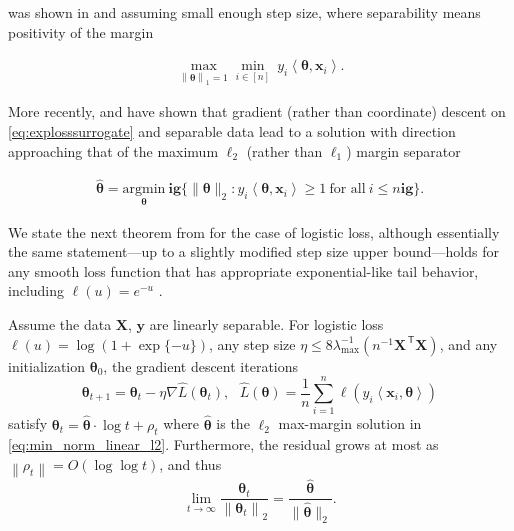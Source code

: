 was shown in \cite{zhang2005boosting} and \cite{telgarsky2013margins} assuming small enough step size, where separability means positivity of the margin

\begin{align}
	\label{eq:max_l1_margin}
	\max_{\left\|{\boldsymbol \theta}\right\|_1 = 1} \min_{i\in[n]}~ y_i\left\langle {\boldsymbol \theta},{\boldsymbol x}_i \right\rangle.
\end{align}

More recently, \cite{soudry2018implicit} and \cite{ji2018risk} have shown that gradient (rather than coordinate) descent on \eqref{eq:explosssurrogate} and separable data lead to a solution with direction approaching that of the maximum $\ell_2$ (rather than $\ell_1$) margin separator

\begin{align}
	\label{eq:min_norm_linear_l2}
	\widehat{{\boldsymbol \theta}} = \underset{{\boldsymbol \theta}}{\mathrm{argmin}} \  \mathbf{ig}\{ \| {\boldsymbol \theta} \|_2 : y_i\left\langle {\boldsymbol \theta},{\boldsymbol x}_i \right\rangle \geq 1 ~\text{for all}~ i \leq n \mathbf{ig}\}.
\end{align}

We state the next theorem from \cite{soudry2018implicit} for the case of logistic loss, although essentially the same statement---up to a slightly modified step size upper bound---holds for any smooth loss function that has appropriate exponential-like tail behavior, including $\ell(u)=e^{-u}$  \cite{soudry2018implicit,ji2018risk}.

\begin{theorem}
	Assume the data ${\boldsymbol X}$, ${\boldsymbol y}$ are linearly separable. For logistic loss $\ell(u)=\log(1+\exp\{-u\})$, any step size $\eta\leq 8
    \lambda^{-1}_{\text{max}}(n^{-1}\boldsymbol{{\boldsymbol X}}^\ensuremath{{\scriptscriptstyle\mathsf{\,T}}} \boldsymbol{{\boldsymbol X}})$, and any initialization ${\boldsymbol \theta}_0$, the gradient descent iterations
	$${\boldsymbol \theta}_{t+1} = {\boldsymbol \theta}_t - \eta \nabla \widehat{L}({\boldsymbol \theta}_t), ~~~\widehat{L}({\boldsymbol \theta}) = \frac{1}{n}\sum_{i=1}^n \ell (y_i \left\langle {\boldsymbol x}_i, {\boldsymbol \theta} \right\rangle)$$
	satisfy ${\boldsymbol \theta}_t = \widehat{{\boldsymbol \theta}} \cdot \log t + \rho_t$
	where $\widehat{{\boldsymbol \theta}}$ is the $\ell_2$ max-margin solution in \eqref{eq:min_norm_linear_l2}.
	Furthermore, the residual grows at most as $\left\|\rho_t\right\|= O(\log\log t)$, and thus
	$$\lim_{t\to\infty} \frac{{\boldsymbol \theta}_t}{\left\|{\boldsymbol \theta}_t\right\|_2} = \frac{\widehat{{\boldsymbol \theta}}}{\|\widehat{{\boldsymbol \theta}}\|_2}.$$
\end{theorem}

